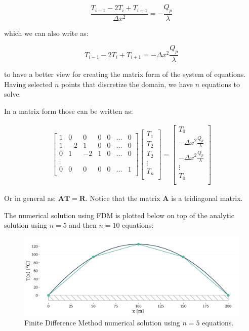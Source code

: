 \documentclass[20pt]{report}
\begin{document}
$$\frac{T_{i-1} - 2 T_i + T_{i+1}}{\Delta x^2} = - \frac{Q_p}{\lambda}$$

which we can also write as:

$$T_{i-1} - 2 T_i + T_{i+1} = - \Delta x^2 \frac{Q_p}{\lambda}$$

to have a better view for creating the matrix form of the system of equations. Having selected $n$ points that discretize the domain, we have $n$ equations to solve.

In a matrix form those can be written as:

\begin{gather}
\begin{bmatrix}
1 & 0 & 0 & 0 & 0 & \dots & 0 \\
1 & -2 & 1 & 0 & 0 & \dots & 0 \\
0 & 1 & -2 & 1 & 0 & \dots & 0 \\
\vdots \\
0 & 0 & 0 & 0 & 0 & \dots & 1 \\
\end{bmatrix}
\begin{bmatrix}
T_1  \\
T_2 \\
T_2 \\
\vdots \\
T_n \\
\end{bmatrix}
=
\begin{bmatrix}
T_0  \\
- \Delta x^2 \frac{Q_p}{\lambda} \\
- \Delta x^2 \frac{Q_p}{\lambda} \\
\vdots \\
T_0 \\
\end{bmatrix}
\end{gather}

Or in general as: $\mathbf{A} \mathbf{T} = \mathbf{R}$. Notice that the matrix $\mathbf{A}$ is a tridiagonal matrix. 

The numerical solution using FDM is plotted below on top of the analytic solution using $n=5$ and then $n=10$ equations:

\begin{figure}[H]
\centering\includegraphics[width=12cm]{plots/example-heat-transfer-in-a-rod-FDM-n5.png}
\caption{Finite Difference Method numerical solution using $n=5$ equations.}
\label{fig:FDM-solution}
\end{figure}
\end{document}

